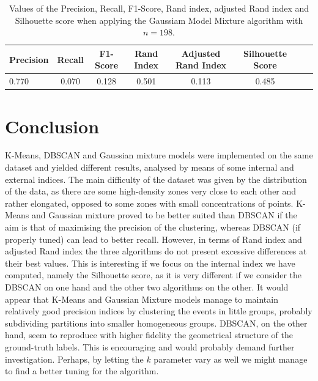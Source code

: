 \documentclass[a4paper]{article}
\begin{document}
	\begin{table}[H]
		\centering
		\begin{tabular}{l*{6}{c}r}
			Precision & Recall & F1-Score & Rand Index & Adjusted Rand Index  & Silhouette Score \\
			\hline
			0.770 & 0.070 & 0.128 & 0.501 & 0.113 & 0.485 \\
		\end{tabular}
	\caption{Values of the Precision, Recall, F1-Score, Rand index, adjusted Rand index and Silhouette score when applying the Gaussiam Model Mixture algorithm with $n= 198$.}
	\label{table:GMM}
	\end{table}

 	\section{Conclusion}
 	K-Means, DBSCAN and Gaussian mixture models were implemented on the same dataset and yielded different results, analysed by means of some internal and external indices. The main difficulty of the dataset was given by the distribution of the data, as there are some high-density zones very close to each other and rather elongated, opposed to some zones with small concentrations of points.  K-Means and Gaussian mixture proved to be better suited than DBSCAN if the aim is that of maximising the precision of the clustering, whereas DBSCAN (if properly tuned) can lead to better recall. However, in terms of Rand index and adjusted Rand index the three algorithms do not present excessive differences at their best values. This is interesting if we focus on the internal index we have computed, namely the Silhouette score, as it is very different if we consider the DBSCAN on one hand and the other two algorithms on the other. It would appear that K-Means and Gaussian Mixture models manage to maintain relatively good precision indices by clustering the events in little groups, probably subdividing partitions into smaller homogeneous groups. DBSCAN, on the other hand, seem to reproduce with higher fidelity the geometrical structure of the ground-truth labels. This is encouraging and would probably demand further investigation. Perhaps, by letting the $k$ parameter vary as well we might manage to find a better tuning for the algorithm.
	
	
\end{document}
